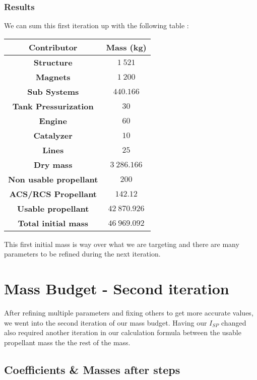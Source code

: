 \subsubsection{Results}
We can sum this first iteration up with the following table :
\begin{center}
\begin{tabular}[H]{|c|c|}
	\hline
	\cellcolor{gray!50}\textbf{Contributor} & \cellcolor{green!20}\textbf{Mass} (kg)\\
	\hline
	\textbf{Structure} & $1\ 521$\\
	\hline
	\textbf{Magnets} & $1\ 200$\\
	\hline
	\textbf{Sub Systems} & $440.166$\\
	\hline
	\textbf{Tank Pressurization} & $30$\\
	\hline
	\textbf{Engine} & $60$\\
	\hline
	\textbf{Catalyzer} & $10$\\
	\hline
	\textbf{Lines} & $25$\\
	\hline
	\cellcolor{gray!50}\textbf{Dry mass} & \cellcolor{green!20} $3\ 286.166$\\
	\hline
	\textbf{Non usable propellant} & $200$\\
	\hline
	\textbf{ACS/RCS Propellant} & $142. 12$\\
	\hline
	\textbf{Usable propellant} & $42\ 870.926$\\
	\cellcolor{red!50}\textbf{Total initial mass} & \cellcolor{red!50}$46\ 969.092$\\
	\hline 
\end{tabular}
\end{center}
This first initial mass is way over what we are targeting and there are many parameters to be refined during the next iteration.
\newpage
\section{Mass Budget - Second iteration}
\qquad After refining multiple parameters and fixing others to get more accurate values, we went into the second iteration of our mass budget. Having our $I_{SP}$ changed also required another iteration in our calculation formula between the usable propellant mass the the rest of the mass.

\subsection{Coefficients \& Masses after steps}

